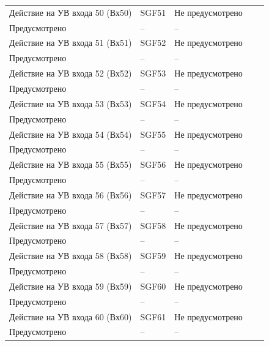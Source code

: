 \begin{longtable}{|>{\centering\arraybackslash}m{5.3cm}|>{\centering\arraybackslash}m{3.3cm}|>{\centering\arraybackslash}m{4.2cm}|>{\centering\arraybackslash}m{1.8cm}|>{\centering\arraybackslash}m{1cm}|}
\hline
\centering Действие на УВ входа 50 (Вх50)  & \centering SGF51 & \centering Не предусмотрено \\ Предусмотрено & \centering -- & \centering \arraybackslash -- \\
\hline
\centering Действие на УВ входа 51 (Вх51)  & \centering SGF52 & \centering Не предусмотрено \\ Предусмотрено & \centering -- & \centering \arraybackslash -- \\
\hline
\centering Действие на УВ входа 52 (Вх52)  & \centering SGF53 & \centering Не предусмотрено \\ Предусмотрено & \centering -- & \centering \arraybackslash -- \\
\hline
\centering Действие на УВ входа 53 (Вх53)  & \centering SGF54 & \centering Не предусмотрено \\ Предусмотрено & \centering -- & \centering \arraybackslash -- \\
\hline
\centering Действие на УВ входа 54 (Вх54)  & \centering SGF55 & \centering Не предусмотрено \\ Предусмотрено & \centering -- & \centering \arraybackslash -- \\
\hline
\centering Действие на УВ входа 55 (Вх55)  & \centering SGF56 & \centering Не предусмотрено \\ Предусмотрено & \centering -- & \centering \arraybackslash -- \\
\hline
\centering Действие на УВ входа 56 (Вх56)  & \centering SGF57 & \centering Не предусмотрено \\ Предусмотрено & \centering -- & \centering \arraybackslash -- \\
\hline
\centering Действие на УВ входа 57 (Вх57)  & \centering SGF58 & \centering Не предусмотрено \\ Предусмотрено & \centering -- & \centering \arraybackslash -- \\
\hline
\centering Действие на УВ входа 58 (Вх58)  & \centering SGF59 & \centering Не предусмотрено \\ Предусмотрено & \centering -- & \centering \arraybackslash -- \\
\hline
\centering Действие на УВ входа 59 (Вх59)  & \centering SGF60 & \centering Не предусмотрено \\ Предусмотрено & \centering -- & \centering \arraybackslash -- \\
\hline
\centering Действие на УВ входа 60 (Вх60)  & \centering SGF61 & \centering Не предусмотрено \\ Предусмотрено & \centering -- & \centering \arraybackslash -- \\

\end{longtable}
